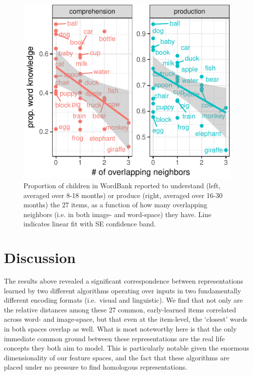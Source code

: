 \documentclass[10pt, letterpaper]{article}
\newenvironment{CodeChunk}{}{}
\begin{document}
\begin{CodeChunk}
\begin{figure}[tb]
\includegraphics{figs/overlap-aoa-graphs-1} \caption[Proportion of children in WordBank reported to understand (left, averaged over 8-18 months) or produce (right, averaged over 16-30 months) the 27 items, as a function of how many overlapping neighbors (i.e]{Proportion of children in WordBank reported to understand (left, averaged over 8-18 months) or produce (right, averaged over 16-30 months) the 27 items, as a function of how many overlapping neighbors (i.e. in both image- and word-space) they have. Line indicates linear fit with SE confidence band.}\label{fig:overlap-aoa-graphs}
\end{figure}
\end{CodeChunk}

\section{Discussion}\label{discussion}

The results above revealed a significant correspondence between
representations learned by two different algorithms operating over
inputs in two fundamentally different encoding formats (i.e.~visual and
linguistic). We find that not only are the relative distances among
these 27 common, early-learned items correlated across word- and
image-space, but that even at the item-level, the `closest' words in
both spaces overlap as well. What is most noteworthy here is that the
only immediate common ground between these representations are the real
life concepts they both aim to model. This is particularly notable given
the enormous dimensionality of our feature spaces, and the fact that
these algorithms are placed under no pressure to find homologous
representations.
\end{document}
